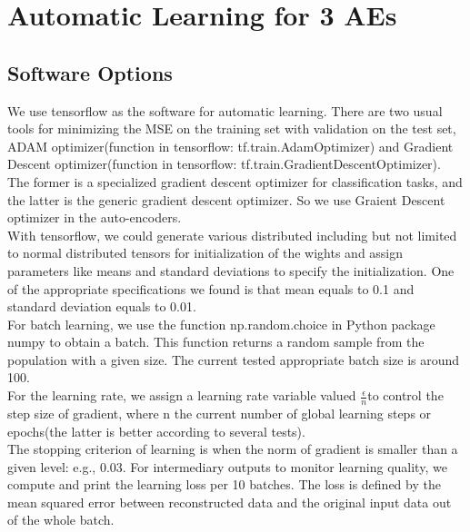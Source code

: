 \documentclass{article}
\begin{document}
 \section{Automatic Learning for 3 AEs}
 \subsection{Software Options}
 We use tensorflow as the software for automatic learning. There are two usual tools for minimizing the MSE on the training set with validation on the test set, ADAM optimizer(function in tensorflow: tf.train.AdamOptimizer) and Gradient Descent optimizer(function in tensorflow: tf.train.GradientDescentOptimizer). The former is a specialized gradient descent optimizer for classification tasks, and the latter is the generic gradient descent optimizer. So we use Graient Descent optimizer in the auto-encoders.\\
 With tensorflow, we could generate various distributed including but not limited to normal distributed tensors for initialization of the wights and assign parameters like means and standard deviations to specify the initialization. One of the appropriate specifications we found is that mean equals to 0.1 and standard deviation equals to 0.01. \\
For batch learning, we use the function np.random.choice in Python package numpy to obtain a batch. This function returns a random sample from the population with a given size. The current tested appropriate batch size is around 100.\\
For the learning rate, we assign a learning rate variable valued $\frac{\epsilon}{n}$to control the step size of gradient, where n the current number of global learning steps or epochs(the latter is better according to several tests).\\
The stopping criterion of learning is when the norm of gradient is smaller than a given level: e.g., 0.03.
For intermediary outputs to monitor learning quality, we compute and print the learning loss per 10 batches. The loss is defined by the mean squared error between reconstructed data and the original input data out of the whole batch.\\
\end{document}
